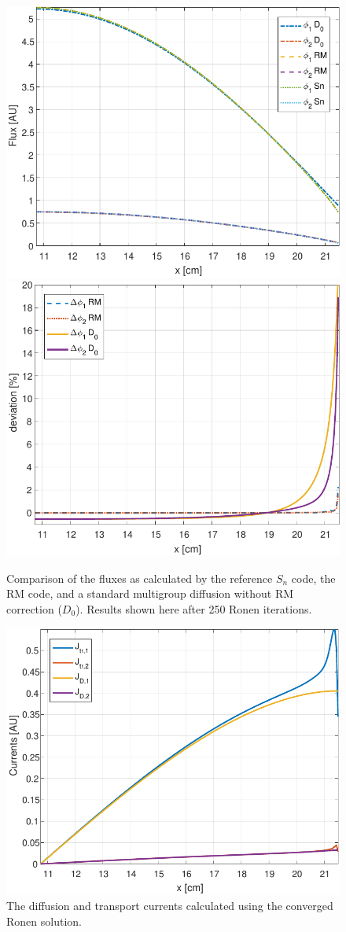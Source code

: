 \begin{figure}[htbp!]
	\centering
	\includegraphics[width=0.45\linewidth]{flux0_half.pdf}
	\includegraphics[width=0.45\linewidth]{flux_deviation_half.pdf}	
	\caption{Comparison of the fluxes as calculated by the reference $S_n$ code, the RM code, and a standard multigroup diffusion without RM correction ($D_0$). Results shown here after 250 Ronen iterations.}
	\label{fig:fluxes}
\end{figure}

\begin{figure}[htbp!]
	\centering
	\includegraphics[width=0.45\linewidth]{current_half.pdf}	
	\caption{The diffusion and transport currents calculated using the converged Ronen solution.}
	\label{fig:current}
\end{figure}

